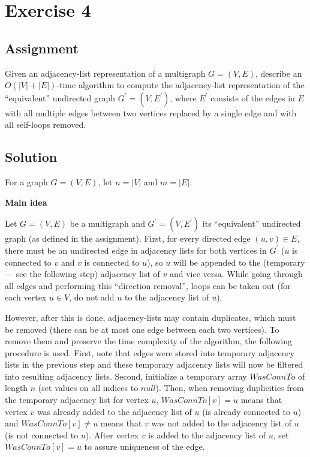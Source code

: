 
\section*{Exercise 4}
\label{sec:Ex4}

\subsection*{Assignment}

Given an adjacency-list representation of a multigraph $G = (V, E)$, describe
an $O(|V| + |E|)$-time algorithm to compute the adjacency-list representation
of the ``equivalent'' undirected graph $G^{'} = (V, E^{'})$, where $E^{'}$
consists of the edges in $E$ with all multiple edges between two vertices
replaced by a single edge and with all self-loops removed.

\subsection*{Solution}

For a graph $G = (V, E)$, let $n = |V|$ and $m = |E|$.

\textbf{Main idea}

Let $G = (V, E)$ be a multigraph and $G^{'} = (V, E^{'})$ its ``equivalent''
undirected graph (as defined in the assignment). First, for every directed edge
$(u, v) \in E$, there must be an undirected edge in adjacency lists for both
vertices in $G^{'}$ ($u$ is connected to $v$ and $v$ is connected to $u$), so
$u$ will be appended to the (temporary --- see the following step) adjacency
list of $v$ and vice versa. While going through all edges and performing this
``direction removal'', loops can be taken out (for each vertex $u \in V$, do
not add $u$ to the adjacency list of $u$).

However, after this is done, adjacency-lists may contain duplicates, which must
be removed (there can be at most one edge between each two vertices). To remove
them and preserve the time complexity of the algorithm, the following procedure
is used. First, note that edges were stored into temporary adjacency lists in
the previous step and these temporary adjacency lists will now be filtered into
resulting adjacency lists. Second, initialize a temporary array $WasConnTo$ of
length $n$ (set values on all indices to $null$). Then, when removing
duplicities from the temporary adjacency list for vertex $u$, $WasConnTo[v] =
u$ means that vertex $v$ was already added to the adjacency list of $u$ (is
already connected to $u$) and $WasConnTo[v] \neq u$ means that $v$ was not
added to the adjacency list of $u$ (is not connected to $u$). After vertex $v$
is added to the adjacency list of $u$, set $WasConnTo[v] = u$ to assure
uniqueness of the edge.

